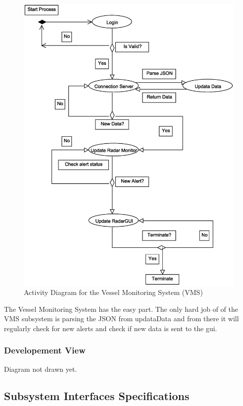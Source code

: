 \documentclass{article}
\begin{document}
\break

\begin{figure}[!htb]
\caption{Activity Diagram for the Vessel Monitoring System (VMS) }
\centering
\includegraphics[scale=0.2]{diagrams/vms-activity-diagram.eps}
\end{figure}

The Vessel Monitoring System has the easy part. The only hard job of of the VMS subsystem is parsing the JSON from updataData and from there it will regularly check for new alerts and check if new data is sent to the gui.

\subsubsection{Developement View} %

Diagram not drawn yet.

\subsection{Subsystem Interfaces Specifications} %
\end{document}
